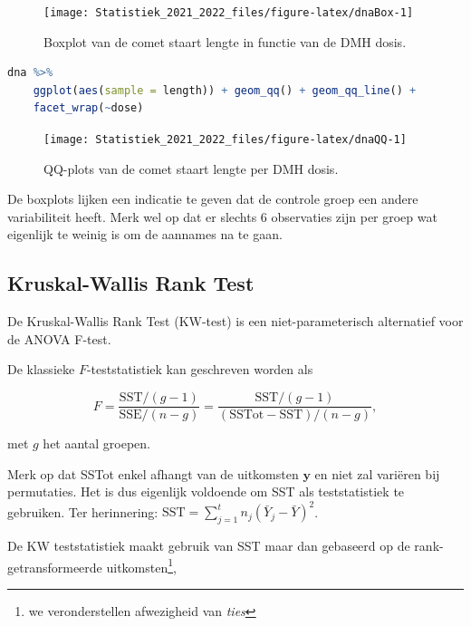 \documentclass[
  12pt,dutch,coursenotes]{book}
\theoremstyle{definition}
\theoremstyle{definition}
\theoremstyle{definition}
\theoremstyle{definition}
\theoremstyle{remark}
\begin{document}
\begin{figure}

{\centering \texttt{[image: Statistiek\_2021\_2022\_files/figure-latex/dnaBox-1]} 

}

\caption{Boxplot van de comet staart lengte in functie van de DMH dosis.}\label{fig:dnaBox}
\end{figure}

\begin{lstlisting}[language=R]
dna %>%
    ggplot(aes(sample = length)) + geom_qq() + geom_qq_line() +
    facet_wrap(~dose)
\end{lstlisting}

\begin{figure}

{\centering \texttt{[image: Statistiek\_2021\_2022\_files/figure-latex/dnaQQ-1]} 

}

\caption{QQ-plots van de comet staart lengte per DMH dosis.}\label{fig:dnaQQ}
\end{figure}

De boxplots lijken een indicatie te geven dat de controle groep een andere variabiliteit heeft.
Merk wel op dat er slechts 6 observaties zijn per groep wat eigenlijk te weinig is om de aannames na te gaan.

\hypertarget{kruskal-wallis-rank-test}{%
\subsection{Kruskal-Wallis Rank Test}\label{kruskal-wallis-rank-test}}

De Kruskal-Wallis Rank Test (KW-test) is een niet-parameterisch alternatief voor de ANOVA F-test.

De klassieke \(F\)-teststatistiek kan geschreven worden als

\[
    F = \frac{\text{SST}/(g-1)}{\text{SSE}/(n-g)} = \frac{\text{SST}/(g-1)}{(\text{SSTot}-\text{SST})/(n-g)} ,
  \]

met \(g\) het aantal groepen.

Merk op dat SSTot enkel afhangt van de uitkomsten \(\mathbf{y}\) en niet zal variëren bij permutaties. Het is dus eigenlijk voldoende om SST als teststatistiek te gebruiken. Ter herinnering: \(\text{SST}=\sum_{j=1}^t n_j(\bar{Y}_j-\bar{Y})^2\).

De KW teststatistiek maakt gebruik van SST maar dan gebaseerd op de rank-getransformeerde uitkomsten\footnote{we veronderstellen afwezigheid van \emph{ties}},
\end{document}
